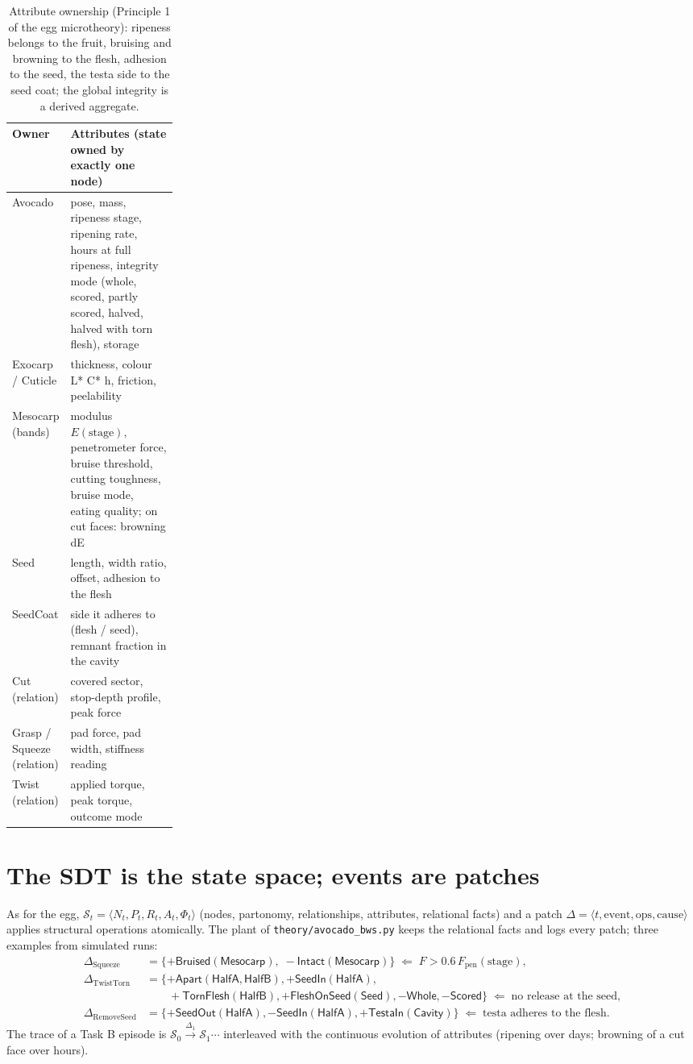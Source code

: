 \documentclass[10.5pt,a4paper]{article}
\begin{document}
\begin{table}[htbp]\centering\scriptsize\caption{Attribute ownership (Principle 1 of the egg microtheory): ripeness belongs to the fruit, bruising and browning to the flesh, adhesion to the seed, the testa side to the seed coat; the global integrity is a derived aggregate.}
\begin{tabularx}{\linewidth}{@{}p{0.24\linewidth}X@{}}\toprule Owner & Attributes (state owned by exactly one node) \\\midrule
Avocado & pose, mass, ripeness stage, ripening rate, hours at full ripeness, integrity mode (whole, scored, partly scored, halved, halved with torn flesh), storage \\
Exocarp / Cuticle & thickness, colour L* C* h, friction, peelability \\
Mesocarp (bands) & modulus $E(\text{stage})$, penetrometer force, bruise threshold, cutting toughness, bruise mode, eating quality; on cut faces: browning dE \\
Seed & length, width ratio, offset, adhesion to the flesh \\
SeedCoat & side it adheres to (flesh / seed), remnant fraction in the cavity \\
Cut (relation) & covered sector, stop-depth profile, peak force \\
Grasp / Squeeze (relation) & pad force, pad width, stiffness reading \\
Twist (relation) & applied torque, peak torque, outcome mode \\\bottomrule\end{tabularx}\end{table}
\section{The SDT is the state space; events are patches}
As for the egg, $\mathcal{S}_t=\langle N_t,P_t,R_t,A_t,\Phi_t\rangle$ (nodes, partonomy, relationships, attributes,
relational facts) and a patch $\Delta=\langle t,\text{event},\text{ops},\text{cause}\rangle$ applies structural
operations atomically. The plant of \texttt{theory/avocado\_bws.py} keeps the relational facts and logs every patch;
three examples from simulated runs:
\begin{align*}
\Delta_\text{Squeeze} &= \{+\mathsf{Bruised}(\mathsf{Mesocarp}),\;-\mathsf{Intact}(\mathsf{Mesocarp})\}
 \;\Leftarrow\; F > 0.6\,F_\text{pen}(\text{stage}),\\
\Delta_\text{TwistTorn} &= \{+\mathsf{Apart}(\mathsf{HalfA},\mathsf{HalfB}),+\mathsf{SeedIn}(\mathsf{HalfA}),\\
 &\qquad +\mathsf{TornFlesh}(\mathsf{HalfB}),+\mathsf{FleshOnSeed}(\mathsf{Seed}),-\mathsf{Whole},-\mathsf{Scored}\}
 \;\Leftarrow\; \text{no release at the seed},\\
\Delta_\text{RemoveSeed} &= \{+\mathsf{SeedOut}(\mathsf{HalfA}),-\mathsf{SeedIn}(\mathsf{HalfA}),
 +\mathsf{TestaIn}(\mathsf{Cavity})\} \;\Leftarrow\; \text{testa adheres to the flesh}.
\end{align*}
The trace of a Task B episode is $\mathcal{S}_0\xrightarrow{\Delta_1}\mathcal{S}_1\cdots$ interleaved with the
continuous evolution of attributes (ripening over days; browning of a cut face over hours).
\end{document}
